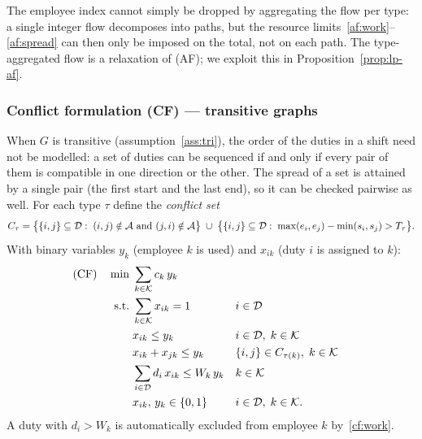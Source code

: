 \begin{remark}
The employee index cannot simply be dropped by aggregating the flow per type:
a single integer flow decomposes into paths, but the resource
limits~\eqref{af:work}--\eqref{af:spread} can then only be imposed on the
total, not on each path. The type-aggregated flow is a relaxation of (AF); we
exploit this in Proposition~\ref{prop:lp-af}.
\end{remark}

\subsubsection{Conflict formulation (CF) --- transitive graphs}

When $G$ is transitive (assumption~\ref{ass:tri}), the order of the duties in
a shift need not be modelled: a set of duties can be sequenced if and only if
every pair of them is compatible in one direction or the other. The spread of
a set is attained by a single pair (the first start and the last end), so it
can be checked pairwise as well. For each type $\tau$ define the
\emph{conflict set}
\[
  C_\tau=\bigl\{\{i,j\}\subseteq\mathcal{D}:\;
     (i,j)\notin\mathcal{A} \text{ and } (j,i)\notin\mathcal{A}\bigr\}
  \;\cup\;
  \bigl\{\{i,j\}\subseteq\mathcal{D}:\;
     \max(e_i,e_j)-\min(s_i,s_j)>T_\tau\bigr\}.
\]
With binary variables $y_k$ (employee $k$ is used) and $x_{ik}$ (duty $i$ is
assigned to $k$):
\begin{align}
\text{(CF)}\quad
\min\;& \sum_{k\in\mathcal{K}} c_k\, y_k \label{cf:obj}\\
\text{s.t.}\;
& \sum_{k\in\mathcal{K}} x_{ik}=1 && i\in\mathcal{D} \label{cf:cover}\\
& x_{ik}\le y_k && i\in\mathcal{D},\;k\in\mathcal{K} \label{cf:link}\\
& x_{ik}+x_{jk}\le y_k && \{i,j\}\in C_{\tau(k)},\;k\in\mathcal{K} \label{cf:conflict}\\
& \sum_{i\in\mathcal{D}} d_i\,x_{ik}\le W_k\,y_k && k\in\mathcal{K} \label{cf:work}\\
& x_{ik},\,y_k\in\{0,1\} && i\in\mathcal{D},\;k\in\mathcal{K}. \nonumber
\end{align}
A duty with $d_i>W_k$ is automatically excluded from employee $k$
by~\eqref{cf:work}.

